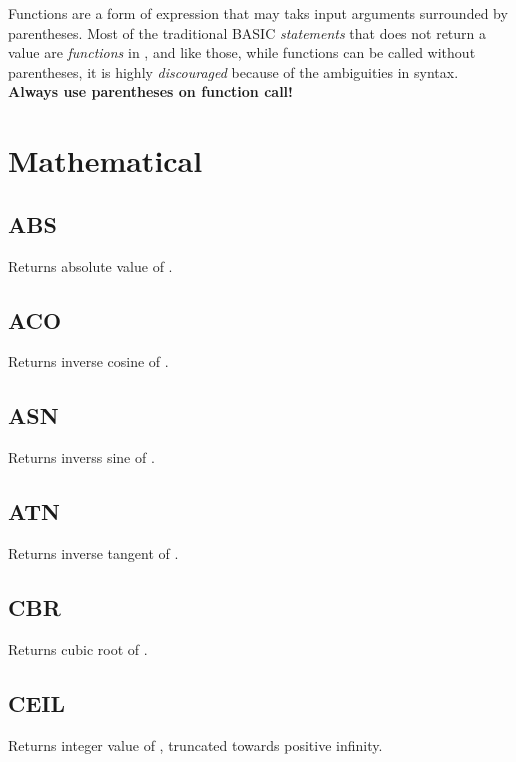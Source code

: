 \label{functions}

Functions are a form of expression that may taks input arguments surrounded by parentheses. Most of the traditional BASIC \emph{statements} that does not return a value are \emph{functions} in \tbas , and like those, while \tbas{} functions can be called without parentheses, it is highly \emph{discouraged} because of the ambiguities in syntax. \textbf{Always use parentheses on function call!}

\section{Mathematical}

    \subsection{ABS}
        \par
        Returns absolute value of .
    \subsection{ACO}
        \par
        Returns inverse cosine of .
    \subsection{ASN}
        \par
        Returns inverss sine of .
    \subsection{ATN}
        \par
        Returns inverse tangent of .
    \subsection{CBR}
        \par
        Returns cubic root of .
    \subsection{CEIL}
        \par
        Returns integer value of , truncated towards positive infinity.

